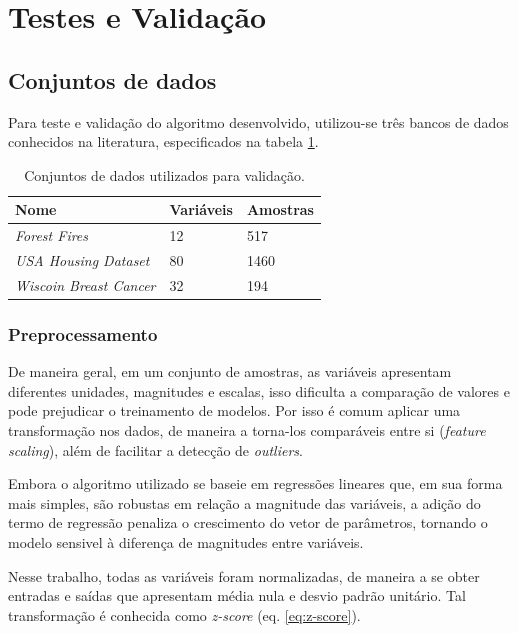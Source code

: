 \section{Testes e Validação}

\subsection{Conjuntos de dados}

Para teste e validação do algoritmo desenvolvido, utilizou-se três bancos de dados conhecidos na literatura, 
especificados na tabela \ref{tbl:datasets}.
\begin{table}[H]
    \caption{Conjuntos de dados utilizados para validação.}
    \centering
    \begin{tabular}{@{}lll@{}}
    \toprule
    Nome                           & Variáveis & Amostras \\ \midrule
    \textit{Forest Fires}          & 12        & 517      \\
    \textit{USA Housing Dataset}   & 80        & 1460     \\
    \textit{Wiscoin Breast Cancer} & 32        & 194      \\ \bottomrule
    \end{tabular}
    \label{tbl:datasets}
\end{table}

\subsubsection{Preprocessamento}

De maneira geral, em um conjunto de amostras, as variáveis apresentam diferentes unidades, magnitudes e escalas, 
isso dificulta a comparação de valores e pode prejudicar o treinamento de modelos. Por isso é comum aplicar uma 
transformação nos dados, de maneira a torna-los comparáveis entre si (\textit{feature scaling}), além de 
facilitar a detecção de \textit{outliers}.

Embora o algoritmo utilizado se baseie em regressões lineares que, em sua forma mais simples, são robustas em 
relação a magnitude das variáveis, a adição do termo de regressão penaliza o crescimento do vetor de parâmetros, 
tornando o modelo sensivel à diferença de magnitudes entre variáveis.

Nesse trabalho, todas as variáveis foram normalizadas, de maneira a se obter entradas e saídas que apresentam 
média nula e desvio padrão unitário. Tal transformação é conhecida como \textit{z-score} (eq. \ref{eq:z-score}).

